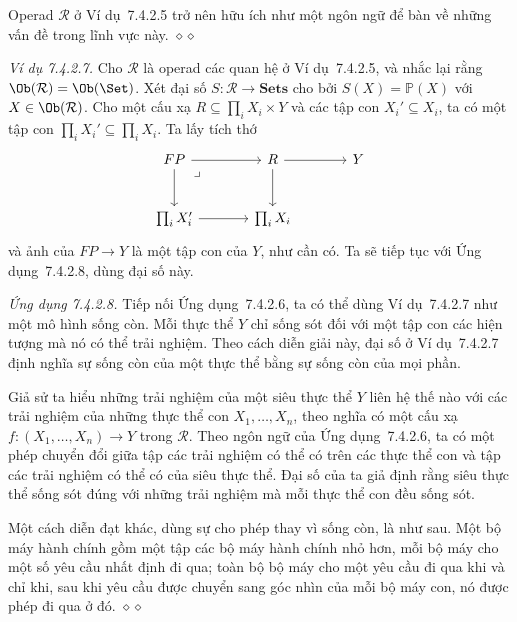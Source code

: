 Operad $\mathcal R$ ở Ví dụ~7.4.2.5 trở nên hữu ích như một ngôn ngữ để bàn về những vấn đề trong lĩnh vực này.
\hfill$\diamond\diamond$

\noindent\textit{Ví dụ 7.4.2.7.}\keepwithnext
Cho $\mathcal R$ là operad các quan hệ ở Ví dụ~7.4.2.5, và nhắc lại rằng $\Ob(\mathcal R)=\Ob(\Set)$. Xét đại số $S:\mathcal R\to\mathbf{Sets}$ cho bởi $S(X)=\mathbb P(X)$ với $X\in\Ob(\mathcal R)$. Cho một cấu xạ $R\subseteq\prod_iX_i\times Y$ và các tập con $X_i'\subseteq X_i$, ta có một tập con $\prod_iX_i'\subseteq\prod_iX_i$. Ta lấy tích thớ
\[
\begin{tikzcd}[column sep=large,row sep=large]
FP\arrow[r]\arrow[d]\arrow[dr,phantom,"\lrcorner",very near start]&R\arrow[d]\arrow[r]&Y\\
\prod_iX_i'\arrow[r]&\prod_iX_i&
\end{tikzcd}
\]
và ảnh của $FP\to Y$ là một tập con của $Y$, như cần có. Ta sẽ tiếp tục với Ứng dụng~7.4.2.8, dùng đại số này.

\noindent\textit{Ứng dụng 7.4.2.8.}\keepwithnext
Tiếp nối Ứng dụng~7.4.2.6, ta có thể dùng Ví dụ~7.4.2.7 như một mô hình sống còn. Mỗi thực thể $Y$ chỉ sống sót đối với một tập con các hiện tượng mà nó có thể trải nghiệm. Theo cách diễn giải này, đại số ở Ví dụ~7.4.2.7 định nghĩa sự sống còn của một thực thể bằng sự sống còn của mọi phần.

Giả sử ta hiểu những trải nghiệm của một siêu thực thể $Y$ liên hệ thế nào với các trải nghiệm của những thực thể con $X_1,\ldots,X_n$, theo nghĩa có một cấu xạ $f:(X_1,\ldots,X_n)\to Y$ trong $\mathcal R$. Theo ngôn ngữ của Ứng dụng~7.4.2.6, ta có một phép chuyển đổi giữa tập các trải nghiệm có thể có trên các thực thể con và tập các trải nghiệm có thể có của siêu thực thể. Đại số của ta giả định rằng siêu thực thể sống sót đúng với những trải nghiệm mà mỗi thực thể con đều sống sót.

Một cách diễn đạt khác, dùng sự cho phép thay vì sống còn, là như sau. Một bộ máy hành chính gồm một tập các bộ máy hành chính nhỏ hơn, mỗi bộ máy cho một số yêu cầu nhất định đi qua; toàn bộ bộ máy cho một yêu cầu đi qua khi và chỉ khi, sau khi yêu cầu được chuyển sang góc nhìn của mỗi bộ máy con, nó được phép đi qua ở đó.
\hfill$\diamond\diamond$
